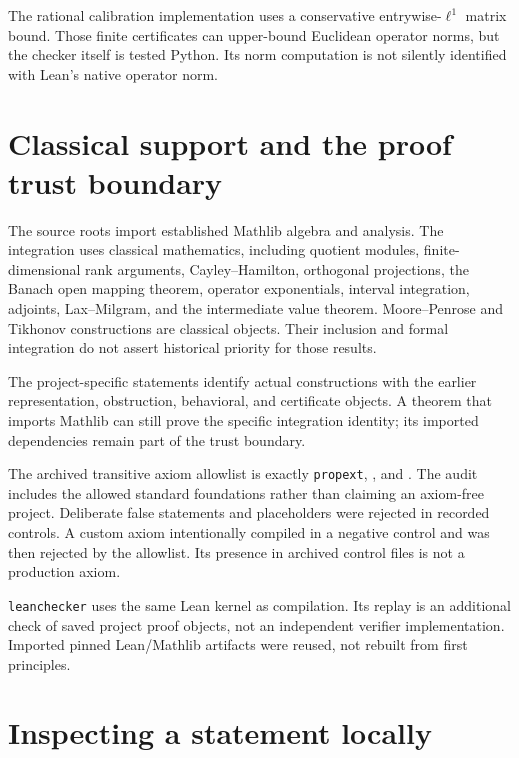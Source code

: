 \documentclass[11pt]{article}
\begin{document}
The rational calibration implementation uses a conservative
entrywise-\(\ell^1\) matrix bound. Those finite certificates can
upper-bound Euclidean operator norms, but the checker itself is tested
Python. Its norm computation is not silently identified with Lean's
native operator norm.

\hypertarget{classical-support-and-the-proof-trust-boundary}{%
\section{Classical support and the proof trust
boundary}\label{classical-support-and-the-proof-trust-boundary}}

The source roots import established Mathlib algebra and analysis. The
integration uses classical mathematics, including quotient modules,
finite-dimensional rank arguments, Cayley--Hamilton, orthogonal
projections, the Banach open mapping theorem, operator exponentials,
interval integration, adjoints, Lax--Milgram, and the intermediate value
theorem. Moore--Penrose and Tikhonov constructions are classical
objects. Their inclusion and formal integration do not assert historical
priority for those results.

The project-specific statements identify actual constructions with the
earlier representation, obstruction, behavioral, and certificate
objects. A theorem that imports Mathlib can still prove the specific
integration identity; its imported dependencies remain part of the trust
boundary.

The archived transitive axiom allowlist is exactly
\texttt{propext},
\texttt{}, and
\texttt{}. The audit includes the allowed
standard foundations rather than claiming an axiom-free project.
Deliberate false statements and placeholders were rejected in recorded
controls. A custom axiom intentionally compiled in a negative control
and was then rejected by the allowlist. Its presence in archived control
files is not a production axiom.

\texttt{leanchecker} uses the same Lean kernel as
compilation. Its replay is an additional check of saved project proof
objects, not an independent verifier implementation. Imported pinned
Lean/Mathlib artifacts were reused, not rebuilt from first principles.

\hypertarget{inspecting-a-statement-locally}{%
\section{Inspecting a statement
locally}\label{inspecting-a-statement-locally}}
\end{document}
